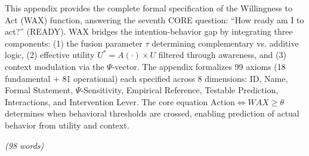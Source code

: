 \begin{tcolorbox}[colback=white, colframe=black,
    title=\textbf{Abstract}]

This appendix provides the complete formal specification of the Willingness to Act (WAX) function,
answering the seventh CORE question: ``How ready am I to act?'' (READY). WAX bridges the
intention-behavior gap by integrating three components: (1) the fusion parameter $\tau$ determining
complementary vs. additive logic, (2) effective utility $U^* = A(\cdot) \times U$ filtered through
awareness, and (3) context modulation via the $\Psi$-vector. The appendix formalizes 99 axioms
(18 fundamental + 81 operational) each specified across 8 dimensions: ID, Name, Formal Statement,
$\Psi$-Sensitivity, Empirical Reference, Testable Prediction, Interactions, and Intervention Lever.
The core equation $\text{Action} \Leftrightarrow WAX \geq \theta$ determines when behavioral
thresholds are crossed, enabling prediction of actual behavior from utility and context.

\textit{(98 words)}

\end{tcolorbox}


